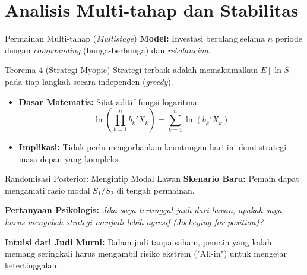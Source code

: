 \documentclass{beamer}
\begin{document}
\section{Analisis Multi-tahap dan Stabilitas}

\begin{frame}{Permainan Multi-tahap (\textit{Multistage})}
    \textbf{Model:}
    Investasi berulang selama $n$ periode dengan \textit{compounding} (bunga-berbunga) dan \textit{rebalancing}.
    
    \begin{block}{Teorema 4 (Strategi Myopic)}
        Strategi terbaik adalah memaksimalkan $E[\ln S]$ pada tiap langkah secara independen (\textit{greedy}).
    \end{block}
    
    \begin{itemize}
        \item \textbf{Dasar Matematis:} Sifat aditif fungsi logaritma:
        $$\ln\left(\prod_{k=1}^n b_k' X_k\right) = \sum_{k=1}^n \ln(b_k' X_k)$$
        \item \textbf{Implikasi:} Tidak perlu mengorbankan keuntungan hari ini demi strategi masa depan yang kompleks.
    \end{itemize}
\end{frame}

\begin{frame}{Randomisasi Posterior: Mengintip Modal Lawan}
    \textbf{Skenario Baru:}
    Pemain dapat mengamati rasio modal $S_1/S_2$ di tengah permainan.
    
    \vspace{0.5cm}
    \textbf{Pertanyaan Psikologis:}
    \textit{Jika saya tertinggal jauh dari lawan, apakah saya harus mengubah strategi menjadi lebih agresif (Jockeying for position)?}
    
    \vspace{0.5cm}
    \textbf{Intuisi dari Judi Murni:}
    Dalam judi tanpa saham, pemain yang kalah memang seringkali harus mengambil risiko ekstrem ("All-in") untuk mengejar ketertinggalan.
\end{frame}
\end{document}
